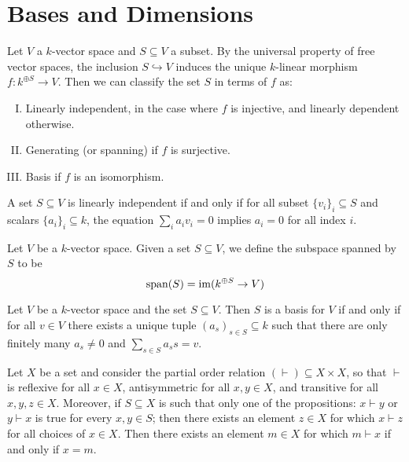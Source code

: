 \section{Bases and Dimensions}

\begin{definition}
  Let \(V\) a \(k\)-vector space and \(S \subseteq V\) a subset. By the
  universal property of free vector spaces, the inclusion \(S \hookrightarrow
  V\) induces the unique \(k\)-linear morphism \(f : k^{\oplus S} \to V\). Then
  we can classify the set \(S\) in terms of \(f\) as:
  \begin{enumerate}[I.]
    \item Linearly independent, in the case where \(f\) is injective, and
      linearly dependent otherwise.
    \item Generating (or spanning) if \(f\) is surjective.
    \item Basis if \(f\) is an isomorphism.
  \end{enumerate}
\end{definition}

\begin{proposition}
  A set \(S \subseteq V\) is linearly independent if and only if for all subset
  \(\{v_i\}_i \subseteq S\) and scalars \(\{a_i\}_i \subseteq k\), the equation
  \(\sum_i a_i v_i = 0\) implies \(a_i = 0\) for all index \(i\).
\end{proposition}

\begin{definition}
  Let \(V\) be a \(k\)-vector space. Given a set \(S \subseteq V\), we define
  the subspace spanned by \(S\) to be
  \[
    \mathrm{span}(S) = \operatorname{im}(k^{\oplus S} \to V)
  \]
\end{definition}

\begin{proposition}
  Let \(V\) be a \(k\)-vector space and the set \(S \subseteq V\). Then \(S\) is
  a basis for \(V\) if and only if for all \(v \in V\) there exists a unique
  tuple \((a_s)_{s \in S} \subseteq k\) such that there are only finitely many
  \(a_s \neq 0\) and \(\sum_{s \in S} a_s s = v\).
\end{proposition}

\begin{lemma}
  Let \(X\) be a set and consider the partial order relation \((\vdash)
  \subseteq X \times X\), so that \(\vdash\) is reflexive for all \(x \in X\),
  antisymmetric for all \(x, y \in X\), and transitive for all \(x, y, z \in
  X\). Moreover, if \(S \subseteq X\) is such that only one of the propositions:
  \(x \vdash y\) or \(y \vdash x\) is true for every \(x, y \in S\); then there
  exists an element \(z \in X\) for which \(x \vdash z\) for all choices of \(x
  \in X\). Then there exists an element \(m \in X\) for which \(m \vdash x\) if
  and only if \(x = m\).
\end{lemma}

